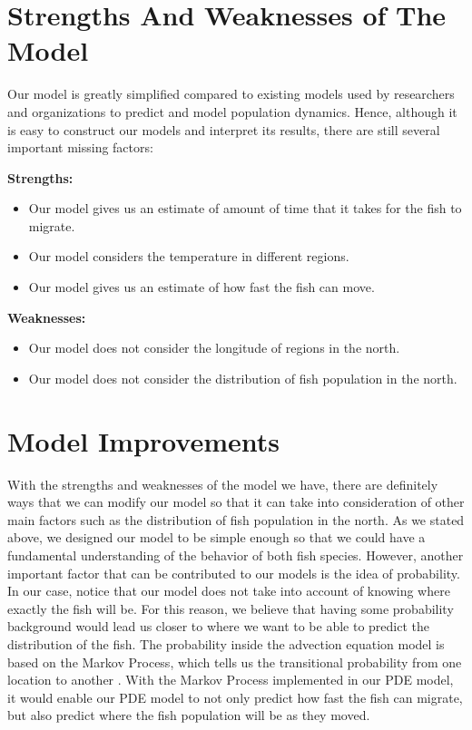 \documentclass[12pt]{article}
\begin{document}
\section{Strengths And Weaknesses of The Model}
Our model is greatly simplified compared to existing models used by researchers and organizations to predict and model population dynamics. Hence, although it is easy to construct our models and interpret its results, there are still several important missing factors:

\textbf{Strengths:} 
\begin{itemize}
    \item Our model gives us an estimate of amount of time that it takes for the fish to migrate.
    \item Our model considers the temperature in different regions.
    \item Our model gives us an estimate of how fast the fish can move.
\end{itemize}

\textbf{Weaknesses:}
\begin{itemize}
    \item Our model does not consider the longitude of regions in the north.
    \item Our model does not consider the distribution of fish population in the north.
\end{itemize}

\section{Model Improvements}

With the strengths and weaknesses of the model we have, there are definitely ways that we can modify our model so that it can take into consideration of other main factors such as the distribution of fish population in the north. As we stated above, we designed our model to be simple enough so that we could have a fundamental understanding of the behavior of both fish species. However, another important factor that can be contributed to our models is the idea of probability. In our case, notice that our model does not take into account of knowing where exactly the fish will be. For this reason, we believe that having some probability background would lead us closer to where we want to be able to predict the distribution of the fish. The probability inside the advection equation model is based on the Markov Process, which tells us the transitional probability from one location to another \cite{advection_dispersion}. With the Markov Process implemented in our PDE model, it would enable our PDE model to not only predict how fast the fish can migrate, but also predict where the fish population will be as they moved. 
\end{document}
